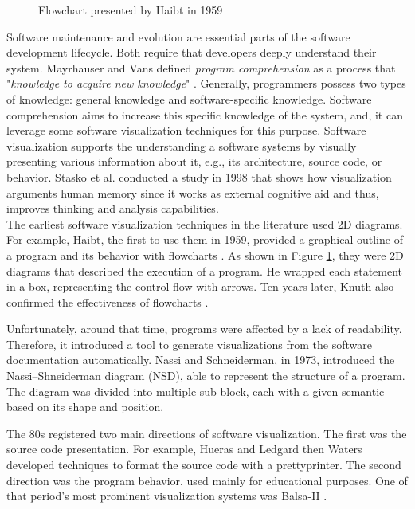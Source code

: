 \begin{figure}
  \caption{Flowchart presented by Haibt in 1959}
  \label{fig:Haibt1959_Flowchart}

\end{figure}

Software maintenance and evolution are essential parts of the software development lifecycle. Both require that developers deeply understand their system. 
Mayrhauser and Vans defined {\it program comprehension} as a process that "{\it knowledge to acquire new knowledge}" \cite{VonMayrhauser1995}. 
Generally, programmers possess two types of knowledge: general knowledge and software-specific knowledge. 
Software comprehension aims to increase this specific knowledge of the system, and, it can leverage some software visualization techniques for this purpose. 
Software visualization supports the understanding a software systems
by visually presenting various information about it, e.g., its architecture, source code, or behavior.
Stasko et al.\cite{Stasko2008} conducted a study in 1998 that shows how visualization arguments human memory since it works as external cognitive aid and thus, improves thinking and analysis capabilities. \\




The earliest software visualization techniques in the literature used 2D diagrams. 
For example, Haibt, the first to use them in 1959, provided a graphical outline of a program and its behavior with flowcharts \cite{Haibt1959}. 
As shown in Figure \ref{fig:Haibt1959_Flowchart}, they were 2D diagrams that described the execution of a program.
 He wrapped each statement in a box, representing the control flow with arrows.
Ten years later, Knuth also confirmed the effectiveness of flowcharts \cite{Knuth1963}. 

Unfortunately, around that time, programs were affected by a lack of readability.
Therefore, it introduced a tool to generate visualizations from the software documentation automatically. 
Nassi and Schneiderman\cite{Nassi1973}, in 1973, introduced the Nassi–Shneiderman diagram (NSD), able to represent the structure of a program. 
The diagram was divided into multiple sub-block, each with a given semantic based on its shape and position. 


The 80s registered two main directions of software visualization. The first was the source code presentation.
For example, Hueras and Ledgard \cite{Hueras1977} then Waters \cite{Waters1983} developed techniques to format the source code with a prettyprinter. 
The second direction was the program behavior, used mainly for educational purposes. One of that period's most prominent visualization systems was Balsa-II \cite{Brown1988}.

